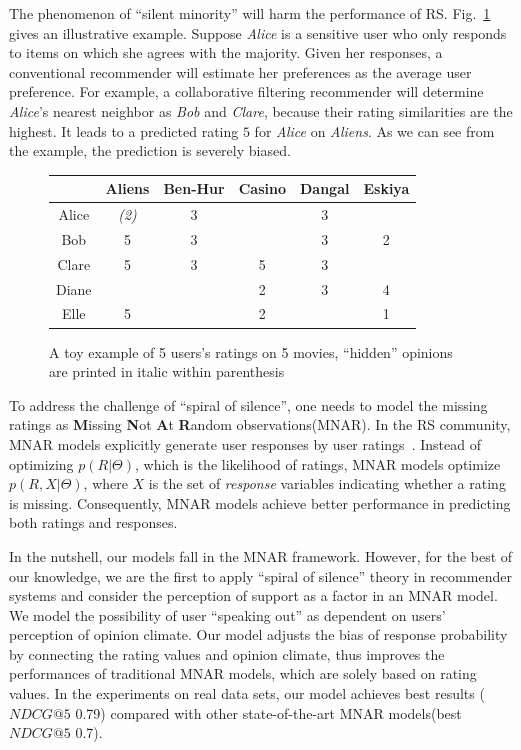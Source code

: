 \documentclass[sigconf]{acmart}
\begin{document}
The phenomenon of ``silent minority'' will harm the performance of RS. Fig.~\ref{fig:example} gives an illustrative example. Suppose \emph{Alice} is a sensitive user who only responds to items on which she agrees with the majority. Given her responses, a conventional recommender will estimate her preferences as the average user preference. For example, a collaborative filtering recommender will determine \emph{Alice}'s nearest neighbor as \emph{Bob} and \emph{Clare}, because their rating similarities are the highest. It leads to a predicted rating $5$ for \emph{Alice} on \emph{Aliens}. As we can see from the example, the prediction is severely biased.

\begin{figure}
\centering
\small
\begin{tabular}{|c|c|c|c|c|c|}
\hline
 & Aliens &  Ben-Hur  & Casino & Dangal & Eskiya \\\hline\hline
 Alice &\emph{ (2)} & 3 & & 3 &  \\\hline
 Bob & 5 & 3 & & 3 &2 \\\hline
Clare & 5 & 3 &5 & 3 & \\\hline
 Diane &  &  &2 & 3 & 4 \\\hline
 Elle & 5 &  &2 &  &  1\\\hline
\end{tabular}
\caption{A toy example of 5 users's ratings on 5 movies, ``hidden'' opinions are printed in italic within parenthesis}\label{fig:example}
\end{figure}

To address the challenge of ``spiral of silence'', one needs to model the missing ratings as \textbf{M}issing \textbf{N}ot \textbf{A}t \textbf{R}andom observations(MNAR). In the RS community,  MNAR models explicitly generate user responses by user ratings~\cite{Hernandez-Lobato2014Probabilistic,Steck2010Training,Marlin2009Collaborative}. Instead of optimizing $p(R|\Theta)$, which is the likelihood of ratings, MNAR models optimize $p(R,X|\Theta)$, where $X$ is the set of \textit{response} variables indicating whether a rating is missing. Consequently, MNAR models achieve better performance in predicting both ratings and responses.

In the nutshell, our models fall in the MNAR framework. However, for the best of our knowledge, we are the first to apply ``spiral of silence'' theory in recommender systems and consider the perception of support as a factor in an MNAR model. We model the possibility of user ``speaking out'' as dependent on users' perception of opinion climate.  Our model adjusts the bias of response probability by connecting the rating values and opinion climate, thus improves the performances of traditional MNAR models, which are solely based on rating values.  In the experiments on real data sets, our model achieves best results ($NDCG@5$ 0.79) compared with other state-of-the-art MNAR models(best $NDCG@5$ 0.7).
\end{document}
